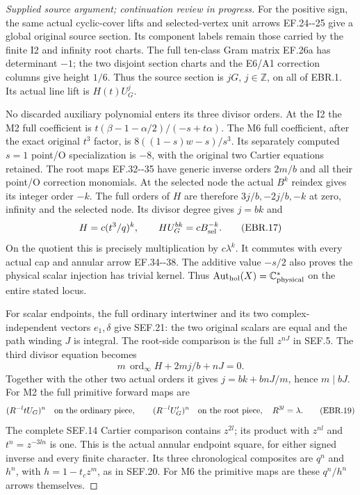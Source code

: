 \begin{proof}[Supplied source argument; continuation review in progress]
For the positive sign, the same actual cyclic-cover lifts and
selected-vertex unit arrows EF.24-\/-25 give a global original
source section. Its component labels remain those carried by
the finite I2 and infinity root charts. The full ten-class Gram
matrix EF.26a has determinant \(-1\); the two disjoint section
charts and the E6/A1 correction columns give height \(1/6\).
Thus the source section is \(jG\), \(j\in\mathbb Z\), on all
of EBR.1. Its actual line lift is \(H(t)U_G^j\).

No discarded auxiliary polynomial enters its three divisor
orders. At the I2 the M2 full coefficient is
\(t(\beta-1-\alpha/2)/(-s+t\alpha)\). The M6 full coefficient,
after the exact original \(t^3\) factor, is
\(8((1-s)w-s)/s^3\). Its separately computed \(s=1\)
point/O specialization is \(-8\), with the original two
Cartier equations retained. The root maps EF.32-\/-35 have
generic inverse orders \(2m/b\) and all their point/O correction
monomials. At the selected node the actual \(B^k\) reindex
gives its integer order \(-k\).
The full orders of \(H\) are therefore \(3j/b,-2j/b,-k\)
at zero, infinity and the selected node. Its divisor degree
gives \(j=bk\) and
\[
 H=c(t^3/q)^k,\qquad H U_G^{bk}=cB_{\rm sel}^{-k}.
 \tag{EBR.17}
\]
On the quotient this is precisely multiplication by
\(c\lambda^k\). It commutes with every actual cap and annular
arrow EF.34-\/-38. The additive value \(-s/2\) also proves the
physical scalar injection has trivial kernel. Thus
\(\operatorname{Aut}_{\rm hol}(X)=\mathbb C^*_{\rm physical}\)
on the entire stated locus.

For scalar endpoints, the full ordinary intertwiner and its
two complex-independent vectors \(e_1,\delta\) give SEF.21:
the two original scalars are equal and the path winding \(J\)
is integral. The root-side comparison is the full
\(z^{nJ}\) in SEF.5. The third divisor equation becomes
\[
 m\,\operatorname{ord}_\infty H+2mj/b+nJ=0.
 \tag{EBR.18}
\]
Together with the other two actual orders it gives
\(j=bk+bnJ/m\), hence \(m\mid bJ\).
For M2 the full primitive forward maps are
\[
 (R^{-l}tU_G)^n\quad\hbox{on the ordinary piece},\qquad
 (R^{-l}U'_G)^n\quad\hbox{on the root piece},
 \quad R^{3l}=\lambda .
 \tag{EBR.19}
\]
The complete SEF.14 Cartier comparison contains \(z^{2l}\);
its product with \(z^{nl}\) and \(t^n=z^{-3ln}\) is one.
This is the actual annular endpoint square, for either signed
inverse and every finite character. Its three chronological
composites are \(q^n\) and \(h^n\), with
\(h=1-t_cz^m\), as in SEF.20. For M6 the primitive maps
are these \(q^n/h^n\) arrows themselves.


\end{proof}
